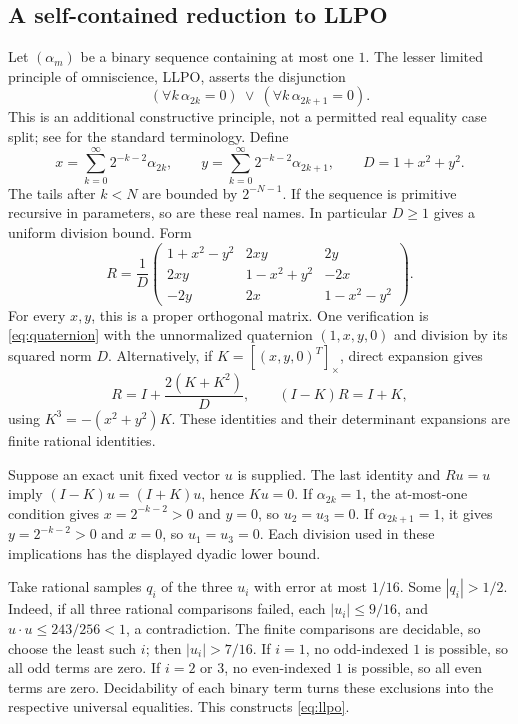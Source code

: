\documentclass[11pt]{article}
\theoremstyle{definition}\newtheorem{definition}[theorem]{Definition}
\newcommand{\crossmat}[1]{[#1]_{\times}}
\begin{document}
\subsection{A self-contained reduction to LLPO}
Let $(\alpha_m)$ be a binary sequence containing at most one $1$.
The lesser limited principle of omniscience, LLPO, asserts the disjunction
\begin{equation}\label{eq:llpo}
 (\forall k\,\alpha_{2k}=0)\ \vee\ (\forall k\,\alpha_{2k+1}=0).
\end{equation}
This is an additional constructive principle, not a permitted real
equality case split; see \cite{bridgesrichman} for the standard terminology.
Define
\[
 x=\sum_{k=0}^\infty 2^{-k-2}\alpha_{2k},\qquad
 y=\sum_{k=0}^\infty 2^{-k-2}\alpha_{2k+1},\qquad D=1+x^2+y^2.
\]
The tails after $k<N$ are bounded by $2^{-N-1}$. If the sequence is
primitive recursive in parameters, so are these real names. In particular
$D\ge1$ gives a uniform division bound. Form
\begin{equation}\label{eq:cayley}
 R=\frac1D\begin{pmatrix}
 1+x^2-y^2&2xy&2y\\
 2xy&1-x^2+y^2&-2x\\
 -2y&2x&1-x^2-y^2
 \end{pmatrix}.
\end{equation}
For every $x,y$, this is a proper orthogonal matrix. One verification is
\eqref{eq:quaternion} with the unnormalized quaternion $(1,x,y,0)$ and
division by its squared norm $D$. Alternatively, if
$K=\crossmat{(x,y,0)^T}$, direct expansion gives
\[
 R=I+\frac{2(K+K^2)}D,\qquad (I-K)R=I+K,
\]
using $K^3=-(x^2+y^2)K$. These identities and their determinant
expansions are finite rational identities.

Suppose an exact unit fixed vector $u$ is supplied. The last identity
and $Ru=u$ imply $(I-K)u=(I+K)u$, hence $Ku=0$.
If $\alpha_{2k}=1$, the at-most-one condition gives
$x=2^{-k-2}>0$ and $y=0$, so $u_2=u_3=0$.
If $\alpha_{2k+1}=1$, it gives $y=2^{-k-2}>0$ and $x=0$, so
$u_1=u_3=0$. Each division used in these implications has the
displayed dyadic lower bound.

Take rational samples $q_i$ of the three $u_i$ with error at most $1/16$.
Some $|q_i|>1/2$. Indeed, if all three rational comparisons failed,
each $|u_i|\le9/16$, and
$u\cdot u\le243/256<1$, a contradiction. The finite comparisons
are decidable, so choose the least such $i$; then $|u_i|>7/16$.
If $i=1$, no odd-indexed $1$ is possible, so all odd terms are zero.
If $i=2$ or $3$, no even-indexed $1$ is possible, so all even terms
are zero. Decidability of each binary term turns these exclusions into
the respective universal equalities. This constructs \eqref{eq:llpo}.
\end{document}
